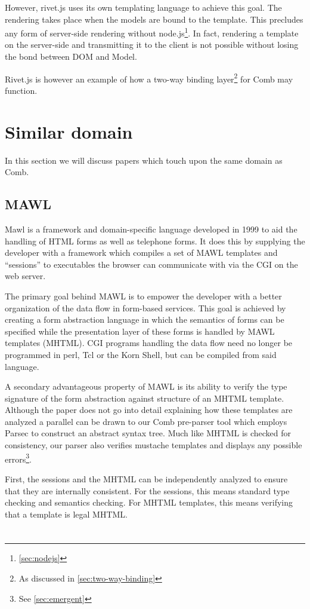 \documentclass[thesis.tex]{subfiles}
\begin{document}
However, rivet.js uses its own templating language to achieve this goal.
The rendering takes place when the models are bound to the template.
This precludes any form of server-side rendering without node.js\footnote{
\ref{sec:nodejs}}. In fact, rendering a template on the server-side and transmitting
it to the client is not possible without losing the bond between DOM and Model.

Rivet.js is however an example of how a two-way binding layer\footnote{
As discussed in \ref{sec:two-way-binding}} for Comb may function.



\section{Similar domain}
In this section we will discuss papers which touch upon the same domain as Comb.

\subsection{MAWL}
Mawl\cite{MAWL} is a framework and domain-specific language developed in 1999
to aid the handling of HTML forms as well as telephone forms.
It does this by supplying the developer with a framework which compiles
a set of MAWL templates and ``sessions'' to executables
the browser can communicate with via the CGI on the web server.

The primary goal behind MAWL is to empower the developer with a better
organization of the data flow in form-based services.
This goal is achieved by creating a form abstraction language in which the
semantics of forms can be specified while the presentation layer of these forms
is handled by MAWL templates (MHTML).
CGI programs handling the data flow need no longer be programmed in
perl, Tcl or the Korn Shell, but can be compiled from said language.

A secondary advantageous property of MAWL is its ability to verify the
type signature of the form abstraction against structure of an MHTML template.
Although the paper does not go into detail explaining how these templates are
analyzed a parallel can be drawn to our Comb pre-parser tool which employs
Parsec to construct an abstract syntax tree. Much like MHTML is checked for
consistency, our parser also verifies mustache templates and displays any
possible errors\footnote{See \ref{sec:emergent}}.
\begin{citequote}{\cite{MAWL}}
First, the sessions and the MHTML can be independently analyzed to ensure that
they are internally consistent.
For the sessions, this means standard type checking and semantics checking.
For MHTML templates, this means verifying that a template is legal MHTML.
\end{citequote}

\subsection{}
\cite{ML}

\section{}

\end{document}
